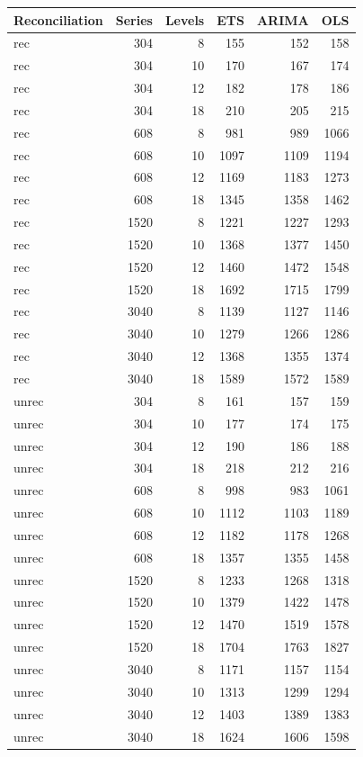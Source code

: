 \documentclass[11pt,a4paper,]{article}
\let\origtable\table
\let\endorigtable\endtable
\renewenvironment{table}[1][2] {
    \expandafter\origtable\expandafter[!htbp]
} {
    \endorigtable
}
\begin{document}
\begin{table}[!h]

\caption{\label{tab:TourismdatasimfixlevelNS}Mean RMSE on 8, 10, 12 and 18 levels of hierarchy with 304, 608, 1520 and 3040 number of bottom level series for ETS, ARIMA and OLS with and without reconciliation - two years forecast points with 0.5 error value - Fixed origin - Simulated tourism dataset}
\centering
\begin{tabular}[t]{lrrrrr}
\toprule
Reconciliation & Series & Levels & ETS & ARIMA & OLS\\
\midrule
rec & 304 & 8 & 155 & 152 & 158\\
rec & 304 & 10 & 170 & 167 & 174\\
rec & 304 & 12 & 182 & 178 & 186\\
rec & 304 & 18 & 210 & 205 & 215\\
rec & 608 & 8 & 981 & 989 & 1066\\
rec & 608 & 10 & 1097 & 1109 & 1194\\
rec & 608 & 12 & 1169 & 1183 & 1273\\
rec & 608 & 18 & 1345 & 1358 & 1462\\
rec & 1520 & 8 & 1221 & 1227 & 1293\\
rec & 1520 & 10 & 1368 & 1377 & 1450\\
rec & 1520 & 12 & 1460 & 1472 & 1548\\
rec & 1520 & 18 & 1692 & 1715 & 1799\\
rec & 3040 & 8 & 1139 & 1127 & 1146\\
rec & 3040 & 10 & 1279 & 1266 & 1286\\
rec & 3040 & 12 & 1368 & 1355 & 1374\\
rec & 3040 & 18 & 1589 & 1572 & 1589\\
unrec & 304 & 8 & 161 & 157 & 159\\
unrec & 304 & 10 & 177 & 174 & 175\\
unrec & 304 & 12 & 190 & 186 & 188\\
unrec & 304 & 18 & 218 & 212 & 216\\
unrec & 608 & 8 & 998 & 983 & 1061\\
unrec & 608 & 10 & 1112 & 1103 & 1189\\
unrec & 608 & 12 & 1182 & 1178 & 1268\\
unrec & 608 & 18 & 1357 & 1355 & 1458\\
unrec & 1520 & 8 & 1233 & 1268 & 1318\\
unrec & 1520 & 10 & 1379 & 1422 & 1478\\
unrec & 1520 & 12 & 1470 & 1519 & 1578\\
unrec & 1520 & 18 & 1704 & 1763 & 1827\\
unrec & 3040 & 8 & 1171 & 1157 & 1154\\
unrec & 3040 & 10 & 1313 & 1299 & 1294\\
unrec & 3040 & 12 & 1403 & 1389 & 1383\\
unrec & 3040 & 18 & 1624 & 1606 & 1598\\
\bottomrule
\end{tabular}
\end{table}
\end{document}
